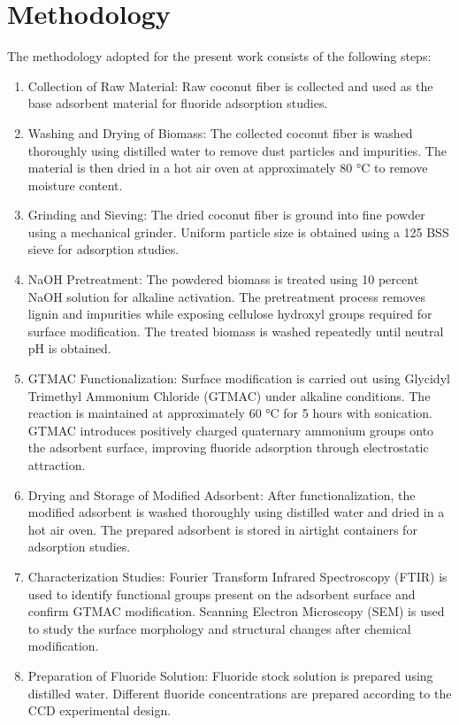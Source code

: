 \section{Methodology}
The methodology adopted for the present work consists of the following steps:
\begin{enumerate}
\item Collection of Raw Material: Raw coconut fiber is collected and used as the base adsorbent material for fluoride adsorption studies.  
\item Washing and Drying of Biomass: The collected coconut fiber is washed thoroughly using distilled water to remove dust particles and impurities. The material is then dried in a hot air oven at approximately 80 °C to remove moisture content.
\item Grinding and Sieving: The dried coconut fiber is ground into fine powder using a mechanical grinder. Uniform particle size is obtained using a 125 BSS sieve for adsorption studies.    
\item NaOH Pretreatment: The powdered biomass is treated using 10 percent NaOH solution for alkaline activation. The pretreatment process removes lignin and impurities while exposing cellulose hydroxyl groups required for surface modification. The treated biomass is washed repeatedly until neutral pH is obtained.    
\item GTMAC Functionalization: Surface modification is carried out using Glycidyl Trimethyl Ammonium Chloride (GTMAC) under alkaline conditions. The reaction is maintained at approximately 60 °C for 5 hours with sonication. GTMAC introduces positively charged quaternary ammonium groups onto the adsorbent surface, improving fluoride adsorption through electrostatic attraction.    
\item Drying and Storage of Modified Adsorbent: After functionalization, the modified adsorbent is washed thoroughly using distilled water and dried in a hot air oven. The prepared adsorbent is stored in airtight containers for adsorption studies.    
\item Characterization Studies: Fourier Transform Infrared Spectroscopy (FTIR) is used to identify functional groups present on the adsorbent surface and confirm GTMAC modification. Scanning Electron Microscopy (SEM) is used to study the surface morphology and structural changes after chemical modification.    
\item Preparation of Fluoride Solution: Fluoride stock solution is prepared using distilled water. Different fluoride concentrations are prepared according to the CCD experimental design.  

\end{enumerate}
